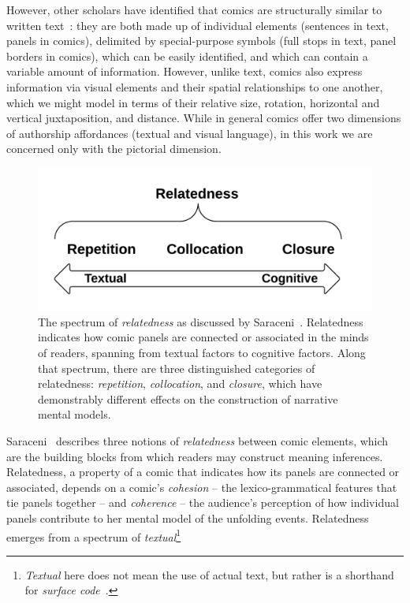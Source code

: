 However, other scholars have identified that comics are structurally similar to written
text~\cite{saraceni2016relatedness}: they are both made up of individual
elements (sentences in text, panels in comics), delimited by special-purpose
symbols (full stops in text, panel borders in comics), which can be easily
identified, and which can contain a variable amount of information. However,
unlike text, comics also express information via visual elements and their spatial
relationships to one another, which we might model in terms of their
relative size, rotation, horizontal and vertical juxtaposition, and
distance. While in general comics offer two dimensions of authorship
affordances (textual and visual language), in this work we are concerned
only with the pictorial dimension.
%
\begin{figure}
	\includegraphics[width=\columnwidth]{relatedness.png}
	\caption{
		The spectrum of \emph{relatedness} as discussed by
                Saraceni~\cite{saraceni2016relatedness}. Relatedness indicates how 
		comic panels are connected or associated in the minds of 
		readers, spanning from textual factors to cognitive factors. 
		Along that spectrum, there are three  distinguished 
		categories of relatedness: \emph{repetition}, 
		\emph{collocation}, and \emph{closure}, which have
		demonstrably different effects on the construction of
		narrative mental models.
		}
	\label{figure:relatedness}
\end{figure}
%
Saraceni~\cite{saraceni2016relatedness} describes three notions of
\emph{relatedness} between comic elements, which are the building blocks
from which readers may construct meaning inferences.
Relatedness, a property of a comic that indicates how its panels are
connected or associated, depends on a comic's \emph{cohesion} -- the
lexico-grammatical features that tie panels together -- and \emph{coherence} --
the audience's perception of how individual panels contribute to her mental model
of the unfolding events. Relatedness emerges from a spectrum of \emph{textual}\footnote{\emph{Textual} here does not mean the use of actual text, but rather is a shorthand for \emph{surface code}~\cite{zwaan1998situation}.}
